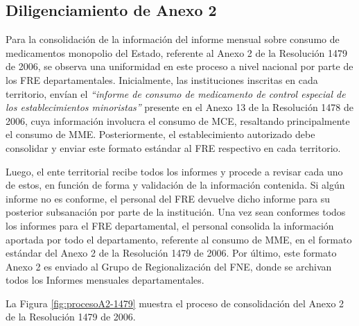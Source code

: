 \documentclass[
]{book}
\begin{document}
\hypertarget{diligenciamiento-de-anexo-2}{%
\subsection{Diligenciamiento de Anexo 2}\label{diligenciamiento-de-anexo-2}}

Para la consolidación de la información del informe mensual sobre consumo de medicamentos monopolio del Estado, referente al Anexo 2 de la Resolución 1479 de 2006, se observa una uniformidad en este proceso a nivel nacional por parte de los FRE departamentales. Inicialmente, las instituciones inscritas en cada territorio, envían el \emph{``informe de consumo de medicamento de control especial de los establecimientos minoristas''} presente en el Anexo 13 de la Resolución 1478 de 2006, cuya información involucra el consumo de MCE, resaltando principalmente el consumo de MME. Posteriormente, el establecimiento autorizado debe consolidar y enviar este formato estándar al FRE respectivo en cada territorio.

Luego, el ente territorial recibe todos los informes y procede a revisar cada uno de estos, en función de forma y validación de la información contenida. Si algún informe no es conforme, el personal del FRE devuelve dicho informe para su posterior subsanación por parte de la institución. Una vez sean conformes todos los informes para el FRE departamental, el personal consolida la información aportada por todo el departamento, referente al consumo de MME, en el formato estándar del Anexo 2 de la Resolución 1479 de 2006. Por último, este formato Anexo 2 es enviado al Grupo de Regionalización del FNE, donde se archivan todos los Informes mensuales departamentales.

La Figura \ref{fig:procesoA2-1479} muestra el proceso de consolidación del Anexo 2 de la Resolución 1479 de 2006.
\end{document}
